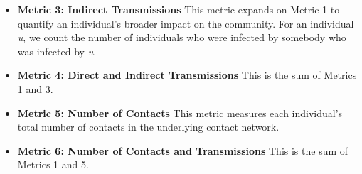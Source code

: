 \documentclass[twocolumn]{bmcart}%
\def\texttt{[image: ]}
\begin{document}
\begin{itemize}
\item \textbf{Metric 3: Indirect Transmissions} This metric expands on Metric 1 to quantify an individual's broader impact on the community.
For an individual \textit{u}, we count the number of individuals who were infected by somebody who was infected by \textit{u}.\\

\item \textbf{Metric 4: Direct and Indirect Transmissions} This is the sum of Metrics 1 and 3.\\

\item \textbf{Metric 5: Number of Contacts} This metric measures each individual's total number of contacts in the underlying contact network.\\

\item \textbf{Metric 6: Number of Contacts and Transmissions} This is the sum of Metrics 1 and 5.
\end{itemize}

\end{document}
